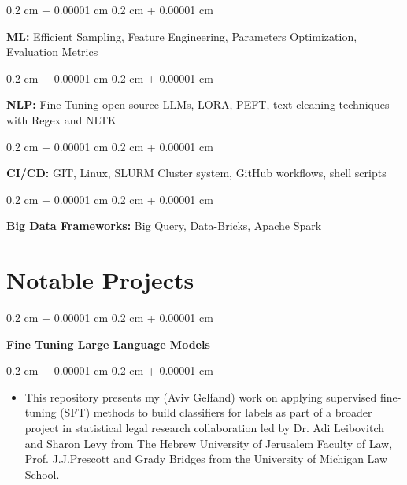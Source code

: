 \documentclass[10pt, letterpaper]{article}
\newenvironment{highlights}{
    \begin{itemize}[
        topsep=0.10 cm,
        parsep=0.8 cm,
        partopsep=0pt,
        itemsep=0pt,
        leftmargin=0.4 cm + 10pt
    ]
}{
    \end{itemize}
} %
\newenvironment{onecolentry}{
    \begin{adjustwidth}{
        0.2 cm + 0.00001 cm
    }{
        0.2 cm + 0.00001 cm
    }
}{
    \end{adjustwidth}
} %
\newenvironment{twocolentry}[2][]{
    \onecolentry
    \def\secondColumn{#2}
    \setcolumnwidth{\fill, 4.5 cm}
    \begin{paracol}{2}
}{
    \switchcolumn \raggedleft \secondColumn
    \end{paracol}
    \endonecolentry
} %
\let\hrefWithoutArrow\href
\renewcommand{\href}[2]{\hrefWithoutArrow{#1}{\ifthenelse{\equal{#2}{}}{ }{#2 }\raisebox{.15ex}{\footnotesize \faExternalLink*}}}
\begin{document}
        \vspace{0.2 cm}

        \begin{onecolentry}
            \textbf{ML:} Efficient Sampling, Feature Engineering, Parameters Optimization, Evaluation Metrics
        \end{onecolentry}

        \vspace{0.2 cm}

        \begin{onecolentry}
            \textbf{NLP:} Fine-Tuning open source LLMs, LORA, PEFT, text cleaning techniques with Regex and NLTK
        \end{onecolentry}

        \vspace{0.2 cm}

        \begin{onecolentry}
            \textbf{CI/CD:} GIT, Linux, SLURM Cluster system, GitHub workflows, shell scripts
        \end{onecolentry}

        \vspace{0.2 cm}

        \begin{onecolentry}
            \textbf{Big Data Frameworks:} Big Query, Data-Bricks, Apache Spark
        \end{onecolentry}


    
    \section{Notable Projects}



        
        \begin{twocolentry}{
            
            
        \textit{\href{https://github.com/AvivGelfand/Fine-tuning-Large-Language-Models}{GitHub Repo}}}
            \textbf{Fine Tuning Large Language Models}
        \end{twocolentry}

        \vspace{0.10 cm}
        \begin{onecolentry}
            \begin{highlights}
                \item This repository presents my (Aviv Gelfand) work on applying supervised fine-tuning (SFT) methods to build classifiers for labels as part of a broader project in statistical legal research collaboration led by Dr. Adi Leibovitch and Sharon Levy from The Hebrew University of Jerusalem Faculty of Law, Prof. J.J.Prescott and Grady Bridges from the University of Michigan Law School.
            \end{highlights}
        \end{onecolentry}
\end{document}
